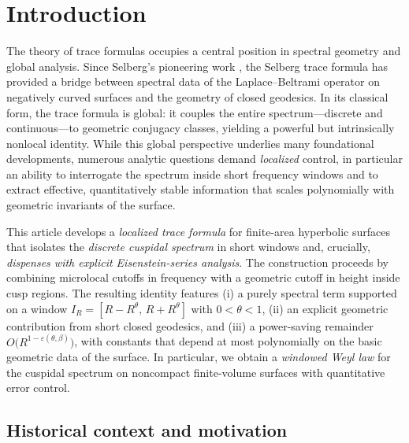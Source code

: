 \section{Introduction}\label{sec:intro}

The theory of trace formulas occupies a central position in spectral geometry and global analysis. Since Selberg’s pioneering work \cite{selberg1956}, the Selberg trace formula has provided a bridge between spectral data of the Laplace--Beltrami operator on negatively curved surfaces and the geometry of closed geodesics. In its classical form, the trace formula is global: it couples the entire spectrum—discrete and continuous—to geometric conjugacy classes, yielding a powerful but intrinsically nonlocal identity. While this global perspective underlies many foundational developments, numerous analytic questions demand \emph{localized} control, in particular an ability to interrogate the spectrum inside short frequency windows and to extract effective, quantitatively stable information that scales polynomially with geometric invariants of the surface.

This article develops a \emph{localized trace formula} for finite-area hyperbolic surfaces that isolates the \emph{discrete cuspidal spectrum} in short windows and, crucially, \emph{dispenses with explicit Eisenstein-series analysis}. The construction proceeds by combining microlocal cutoffs in frequency with a geometric cutoff in height inside cusp regions. The resulting identity features (i) a purely spectral term supported on a window $I_R=[R-R^\theta,\,R+R^\theta]$ with $0<\theta<1$, (ii) an explicit geometric contribution from short closed geodesics, and (iii) a power-saving remainder $O\!\big(R^{1-\varepsilon(\theta,\beta)}\big)$, with constants that depend at most polynomially on the basic geometric data of the surface. In particular, we obtain a \emph{windowed Weyl law} for the cuspidal spectrum on noncompact finite-volume surfaces with quantitative error control.

\subsection{Historical context and motivation}

